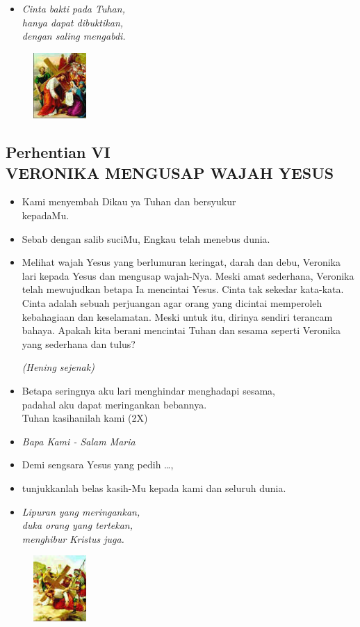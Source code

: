 \documentclass[a5paper,headsepline,titlepage,11pt,nnormalheadings,DIVcalc]{scrbook}
\newcommand{\BU}[1]{\begin{itemize} \item[U:] #1 \end{itemize}}
\newcommand{\BP}[1]{\begin{itemize} \item[P:] #1 \end{itemize}}
\newcommand{\kamiMenyembah}{\BP{ Kami menyembah Dikau ya Tuhan dan bersyukur\\kepadaMu.}
\BU{ Sebab dengan salib suciMu, Engkau telah menebus dunia.}
}
\newcommand{\kasihanilahKami}{\BP{Demi sengsara Yesus yang pedih \ldots,}
\BU{tunjukkanlah belas kasih-Mu kepada kami dan seluruh dunia.}}
\def\hening{\par \textit{(Hening sejenak)}}
\begin{document}
\begin{itemize}
\item[6.] \it{Cinta bakti pada Tuhan,\\ 
	hanya dapat dibuktikan, \\
	dengan saling mengabdi.}
\end{itemize}

\begin{figure}
\includegraphics[width=2cm]{jalansalib_files/06_small.jpg}
\end{figure}
\subsection*{Perhentian VI\\
VERONIKA MENGUSAP WAJAH YESUS}

\kamiMenyembah

\BP{Melihat wajah Yesus yang berlumuran keringat, darah dan debu, Veronika lari kepada Yesus dan mengusap wajah-Nya. Meski amat sederhana, Veronika telah mewujudkan betapa Ia mencintai Yesus. Cinta tak sekedar kata-kata. Cinta adalah sebuah perjuangan agar orang yang dicintai memperoleh kebahagiaan dan keselamatan. Meski untuk itu, dirinya sendiri terancam bahaya. Apakah kita berani mencintai Tuhan dan sesama seperti Veronika yang sederhana dan tulus?
\hening
}

\BU{Betapa seringnya aku lari menghindar menghadapi sesama,\\ padahal aku dapat meringankan bebannya.\\
Tuhan kasihanilah kami (2X)
}


\large\begin{itemize}\item[~]\it{Bapa Kami - Salam Maria}\end{itemize}\normalsize
\kasihanilahKami
 
\begin{itemize}
\item[7.] \it{
Lipuran yang meringankan,\\ 
	duka orang yang tertekan,\\ 
	menghibur Kristus juga.
}
\end{itemize}

\begin{figure}
\includegraphics[width=2cm]{jalansalib_files/07_small.jpg}
\end{figure}
\end{document}
